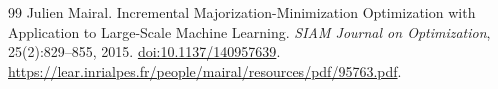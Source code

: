 \begin{thebibliography}{99}
 Julien Mairal. Incremental Majorization-Minimization Optimization with Application to Large-Scale Machine Learning. \emph{SIAM Journal on Optimization}, 25(2):829--855, 2015. \href{https://doi.org/10.1137/140957639}{doi:10.1137/140957639}. \url{https://lear.inrialpes.fr/people/mairal/resources/pdf/95763.pdf}.
\end{thebibliography}
